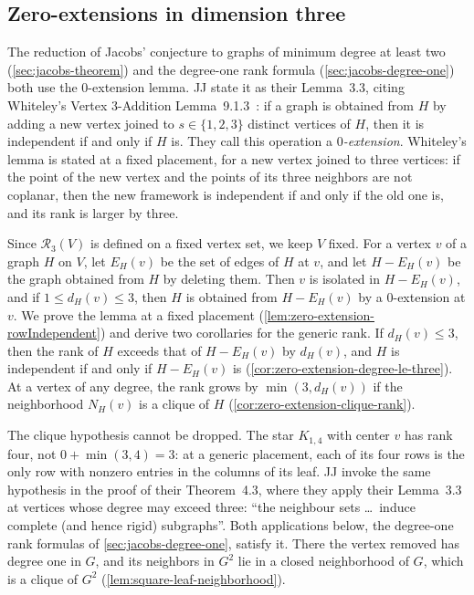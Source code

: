 \subsection{Zero-extensions in dimension three}
\label{sec:jacobs-zero-extension}

The reduction of Jacobs' conjecture to graphs of minimum degree at least
two (\cref{sec:jacobs-theorem}) and the degree-one rank formula
(\cref{sec:jacobs-degree-one}) both use the $0$-extension lemma. JJ
state it as their Lemma~3.3, citing Whiteley's Vertex 3-Addition
Lemma~9.1.3~\cite{whiteley1996}: if a graph is obtained from $H$ by
adding a new vertex joined to $s \in \{1, 2, 3\}$ distinct vertices of
$H$, then it is independent if and only if $H$ is. They call this
operation a \emph{$0$-extension}. Whiteley's lemma is stated at a fixed
placement, for a new vertex joined to three vertices: if the point of
the new vertex and the points of its three neighbors are not coplanar,
then the new framework is independent if and only if the old one is, and
its rank is larger by three.

Since $\mathcal{R}_3(V)$ is defined on a fixed vertex set, we keep $V$
fixed. For a vertex $v$ of a graph $H$ on $V$, let $E_H(v)$ be the
set of edges of $H$ at $v$, and let $H - E_H(v)$ be the graph obtained
from $H$ by deleting them. Then $v$ is isolated in $H - E_H(v)$, and if
$1 \le d_H(v) \le 3$, then $H$ is obtained from $H - E_H(v)$ by a
$0$-extension at $v$. We prove the lemma at a fixed placement
(\cref{lem:zero-extension-rowIndependent}) and derive two corollaries
for the generic rank. If $d_H(v) \le 3$, then the rank of $H$ exceeds
that of $H - E_H(v)$ by $d_H(v)$, and $H$ is independent if and only if
$H - E_H(v)$ is (\cref{cor:zero-extension-degree-le-three}). At a vertex
of any degree, the rank grows by $\min(3, d_H(v))$ if the neighborhood
$N_H(v)$ is a clique of $H$ (\cref{cor:zero-extension-clique-rank}).

The clique hypothesis cannot be dropped. The star $K_{1,4}$ with center
$v$ has rank four, not $0 + \min(3, 4) = 3$: at a generic placement,
each of its four rows is the only row with nonzero entries in the
columns of its leaf. JJ invoke the same hypothesis in the proof of their
Theorem~4.3, where they apply their Lemma~3.3 at vertices whose degree
may exceed three: ``the neighbour sets \dots\ induce complete (and hence
rigid) subgraphs''. Both applications below, the degree-one rank
formulas of \cref{sec:jacobs-degree-one}, satisfy it. There the vertex
removed has degree one in $G$, and its neighbors in $G^2$ lie in a
closed neighborhood of $G$, which is a clique of $G^2$
(\cref{lem:square-leaf-neighborhood}).

